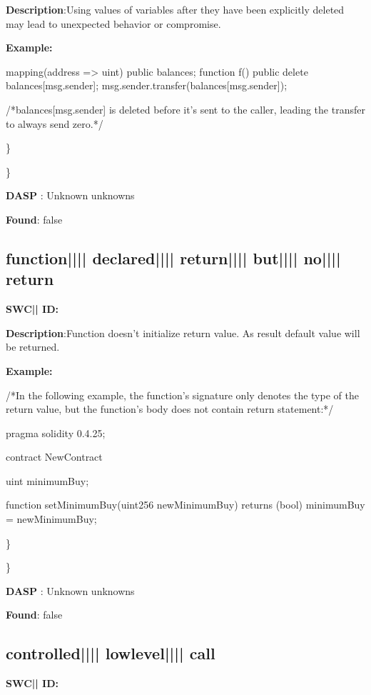 \documentclass{article}
\begin{document}
\textbf{Description}:Using values of variables after they have been explicitly deleted may lead to unexpected behavior or compromise.


\textbf{Example:} 
\begin{ffcode} 

mapping(address => uint) public balances;
function f() public {
    delete balances[msg.sender];
    msg.sender.transfer(balances[msg.sender]);
}

 /*balances[msg.sender] is deleted before it's sent to the caller, leading the transfer to always send zero.*/ 

\end{ffcode} 
\} 

\} 

\textbf{DASP} : Unknown unknowns

\textbf{Found}: false

\subsection{function{||\textunderscore|| }declared{||\textunderscore|| }return{||\textunderscore|| }but{||\textunderscore|| }no{||\textunderscore|| }return} 
\textbf{SWC{|\textunderscore| }ID:} 

\textbf{Description}:Function doesn't initialize return value. As result default value will be returned.


\textbf{Example:} 
\begin{ffcode} 

/*In the following example, the function's signature only denotes the type of the return value, but the function's body does not contain return statement:*/ 

pragma solidity 0.4.25;

contract NewContract {
    uint minimumBuy;

    function setMinimumBuy(uint256 newMinimumBuy) returns (bool){
        minimumBuy = newMinimumBuy;
    }
}

\end{ffcode} 
\} 

\} 

\textbf{DASP} : Unknown unknowns

\textbf{Found}: false

\subsection{controlled{||\textunderscore|| }lowlevel{||\textunderscore|| }call} 
\textbf{SWC{|\textunderscore| }ID:} 
\end{document}
